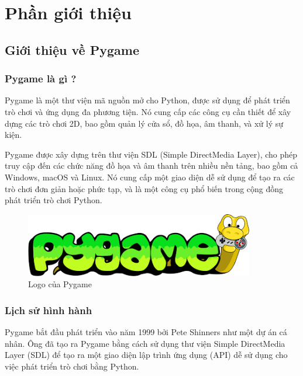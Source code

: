 \documentclass[a4paper]{article}
\begin{document}
\thispagestyle{empty}

\newpage
\tableofcontents
\newpage



\section{Phần giới thiệu}
\subsection{Giới thiệu về Pygame}
\subsubsection{Pygame là gì ?}

\hspace{5mm}
Pygame là một thư viện mã nguồn mở cho Python, được sử dụng để phát triển trò chơi và ứng dụng đa phương tiện. Nó cung cấp các công cụ cần thiết để xây dựng các trò chơi 2D, bao gồm quản lý cửa sổ, đồ họa, âm thanh, và xử lý sự kiện.

Pygame được xây dựng trên thư viện SDL (Simple DirectMedia Layer), cho phép truy cập đến các chức năng đồ họa và âm thanh trên nhiều nền tảng, bao gồm cả Windows, macOS và Linux. Nó cung cấp một giao diện dễ sử dụng để tạo ra các trò chơi đơn giản hoặc phức tạp, và là một công cụ phổ biến trong cộng đồng phát triển trò chơi Python.


\begin{figure}[h!]
\begin{center}
\includegraphics[width=10cm]{image/pygameLogo.png}
\end{center}
\caption{Logo của Pygame}
\end{figure}

\subsubsection{Lịch sử hình hành}
\hspace{5mm}
Pygame bắt đầu phát triển vào năm 1999 bởi Pete Shinners như một dự án cá nhân. Ông đã tạo ra Pygame bằng cách sử dụng thư viện Simple DirectMedia Layer (SDL) để tạo ra một giao diện lập trình ứng dụng (API) dễ sử dụng cho việc phát triển trò chơi bằng Python.
\end{document}
